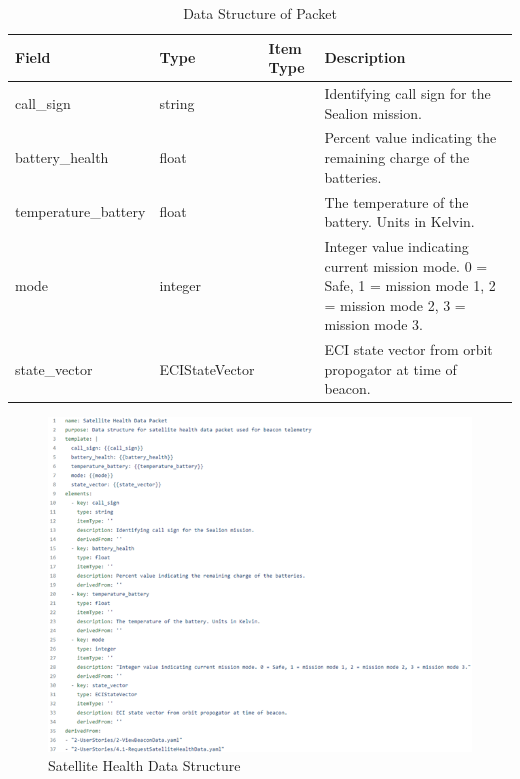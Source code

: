 \documentclass[journal,article,submit,pdftex,moreauthors]{Definitions/mdpi}
\begin{document}
\begin{table}[H] 
	\caption{Data Structure of Packet}
	\label{tab:datastructure}
	\begin{tabularx}{\textwidth}{CCCC}
	\toprule
	\textbf{Field}  & \textbf{Type}  & \textbf{Item Type}  & \textbf{Description}\\
	\midrule
	call\_sign           & string         &  & Identifying call sign for the Sealion mission.                                                                         \\ \hline
	battery\_health      & float          &  & Percent value indicating the remaining charge of the batteries.                                                        \\ \hline
	temperature\_battery & float          &  & The temperature of the battery. Units in Kelvin.                                                                       \\ \hline
	mode                 & integer        &  & Integer value indicating current mission mode. 0 = Safe, 1 = mission mode 1, 2 =   mission mode 2, 3 = mission mode 3. \\ \hline
	state\_vector        & ECIStateVector &  & ECI state vector from orbit propogator at time of beacon. \\    
	\bottomrule
	\end{tabularx}
\end{table}

\begin{figure}[H]
    \includegraphics[width=10.5 cm]{assets/datastructure.png}
    \caption{Satellite Health Data Structure}
	\label{fig:datastructure}
    \end{figure}   
\unskip
\end{document}
